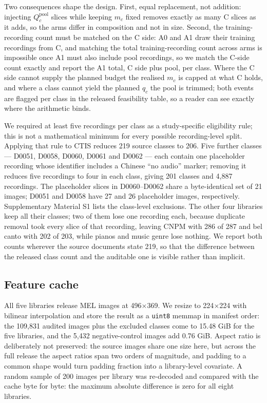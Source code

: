 Two consequences shape the design. First, equal replacement, not addition: injecting
$Q^{\text{pool}}_c$ slices while keeping $m_c$ fixed removes exactly as many C slices as it adds,
so the arms differ in composition and not in size. Second, the training-recording count must be
matched on the C side: A0 and A1 draw their training recordings from C, and matching the total
training-recording count across arms is impossible once A1 must also include pool recordings, so
we match the C-side count exactly and report the A1 total, C side plus pool, per class. Where
the C side cannot supply the planned budget the realised $m_c$ is capped at what C holds, and
where a class cannot yield the planned $q_c$ the pool is trimmed; both events are flagged per
class in the released feasibility table, so a reader can see exactly where the arithmetic binds.

We required at least five recordings per class as a study-specific eligibility rule; this is not a
mathematical minimum for every possible recording-level split. Applying that rule to CTIS reduces 219 source
classes to 206. Five further classes --- D0051, D0058, D0060, D0061 and D0062 --- each contain
one placeholder recording whose identifier includes a Chinese ``no audio'' marker; removing it reduces
five recordings to four in each class, giving 201 classes and 4{,}887 recordings. The placeholder
slices in D0060--D0062 share a byte-identical set of 21 images; D0051 and D0058 have 27 and 26
placeholder images, respectively. Supplementary Material S1 lists the class-level exclusions. The other four libraries keep
all their classes; two of them lose one recording each, because duplicate removal took every
slice of that recording, leaving CNPM with 286 of 287 and bel canto with 202 of 203, while
pianos and music genre lose nothing. We report both counts wherever the source documents state 219, so that the
difference between the released class count and the auditable one is visible rather than
implicit.

\subsection{Feature cache}

All five libraries release MEL images at 496$\times$369. We resize to 224$\times$224 with
bilinear interpolation and store the result as a \texttt{uint8} memmap in manifest order: the
109{,}831 audited images plus the excluded classes come to 15.48 GiB for the five libraries, and
the 5{,}432 negative-control images add 0.76 GiB. Aspect ratio is deliberately not preserved: the source
images share one size here, but across the full release the aspect ratios span two orders of
magnitude, and padding to a common shape would turn padding fraction into a library-level
covariate. A random sample of 200 images per library was re-decoded and compared with the cache
byte for byte: the maximum absolute difference is zero for all eight libraries.
